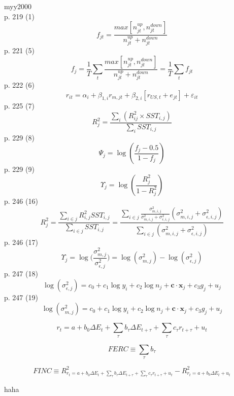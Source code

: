 \documentclass{article}
\begin{document}
myy2000 \\
p. 219 (1)
$$ f_{jt} = \frac{max[n_{jt}^{up}, n_{jt}^{down}]}{n_{jt}^{up} + n^{down}_{jt}} $$
p. 221 (5)
$$ f_j = \frac{1}{T} 
    \displaystyle\sum_t \frac{max[n_{jt}^{up}, n_{jt}^{down}]}
    {n_{jt}^{up} + n_{jt}^{down}} = 
    \frac{1}{T} \displaystyle\sum_t f_{jt} $$
p. 222 (6)
$$ r_{it} = \alpha_i + \beta_{1,i} r_{m,jt} + 
    \beta_{2,i} [r_{US,t} + e_{jt}] + \varepsilon_{it} $$
p. 225 (7)
$$ R_j^2 = \frac{\sum_i (R_{ij}^2 \times SST_{i,j})}{\sum_i SST_{i,j}} $$
p. 229 (8)
$$ \Psi_j = \log(\frac{f_j - 0.5}{1 - f_j}) $$
p. 229 (9)
$$ \Upsilon_j = \log(\frac{R_j^2}{1 - R_j^2}) $$
p. 246 (16)
$$ R_j^2 = \frac{\sum_{i \in j} R_{i,j}^2 SST_{i,j}}{\sum_{i \in j}SST_{i,j}} =
    \frac{\sum_{i \in j} \frac{\sigma_{m,i,j}^2}{\sigma_{m,i,j}^2 + \sigma_{\epsilon,i,j}^2}
    (\sigma_{m,i,j}^2 + \sigma_{\epsilon,i,j}^2)}
    {\sum_{i \in j} (\sigma_{m,i,j}^2 + \sigma_{\epsilon,i,j}^2)} $$
p. 246 (17)
$$ \Upsilon_j = \log\bigg(\frac{\sigma_{m,j}^2}{\sigma_{\epsilon,j}^2}\bigg) =
    \log(\sigma_{m,j}^2) - \log(\sigma_{\epsilon, j}^2)$$
p. 247 (18)
$$ \log(\sigma_{\epsilon,j}^2) = c_0 + c_1 \log y_i + c_2 \log n_j +
    \boldsymbol{c} \cdot \boldsymbol{x}_j + c_3 g_j + u_j $$
p. 247 (19)
$$ \log(\sigma_{m,j}^2) = c_0 + c_1 \log y_i + c_2 \log n_j +
    \boldsymbol{c} \cdot \boldsymbol{x}_j + c_3 g_j + u_j $$


\begin{equation}
    r_t = a + b_0 \Delta E_t + 
    \sum_\tau b_\tau \Delta E_{t + \tau} + 
    \sum_\tau c_\tau r_{t + \tau} + u_t
\end{equation}

\begin{equation}
    FERC \equiv \sum_\tau b_\tau
\end{equation}

\begin{equation}
    FINC \equiv R_{r_t = a + b_0 \Delta E_t + 
    \sum_\tau b_\tau \Delta E_{t + \tau} + 
    \sum_\tau c_\tau r_{t + \tau} + u_t}^2 - 
    R_{r_t = a + b_0 \Delta E_t + u_t}^2
\end{equation}

haha
\end{document}
